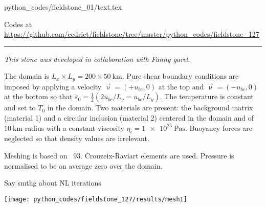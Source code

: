 \begin{flushright} {\tiny {\color{gray} python\_codes/fieldstone\_01/text.tex}} \end{flushright}



\begin{center}

Codes at \url{https://github.com/cedrict/fieldstone/tree/master/python_codes/fieldstone_127}
\end{center}

\par\noindent\rule{\textwidth}{0.4pt}

{\sl This stone was developed in collaboration with Fanny garel}. 


The domain is $L_x \times L_y=200\times 50~\si{\km}$. Pure shear boundary conditions are imposed by 
applying a velocity $\vec\upnu=(+u_{bc},0)$ at the top and $\vec\upnu=(-u_{bc},0)$ at the bottom so 
that $\dot\varepsilon_{0}=\frac12 (2u_{bc}/L_y=u_{bc}/L_y)$.
The temperature is constant and set to $T_0$ in the domain.
Two materials are present: the background matrix (material 1) and a circular inclusion (material 2)
centered in the domain and of $10~\si{\km}$ radius with a constant viscosity $\eta_i=\SI{1e25}{\pascal\second}$.
Buoyancy forces are neglected so that density values are irrelevant.

Meshing is based on \stone~93. Crouzeix-Raviart elements are used. Pressure is normalised to be
on average zero over the domain.

Say smthg about NL iterations


\begin{center}
\texttt{[image: python\_codes/fieldstone\_127/results/mesh1]}
\end{center}

